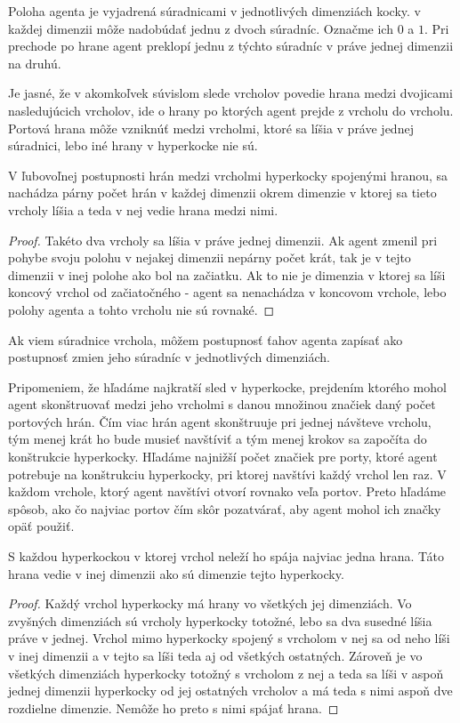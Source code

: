 \begin{ozn}
Poloha agenta je vyjadrená súradnicami v jednotlivých dimenziách kocky. v
každej dimenzii môže nadobúdať jednu z dvoch súradníc. Označme ich $0$ a $1$.
Pri prechode po hrane agent preklopí jednu z týchto súradníc v práve jednej
dimenzii na druhú.
\end{ozn}
Je jasné, že v akomkoľvek súvislom slede vrcholov povedie hrana
medzi dvojicami nasledujúcich vrcholov, ide o hrany po ktorých agent prejde
z vrcholu do vrcholu.
Portová hrana môže vzniknúť medzi vrcholmi, ktoré sa líšia v práve jednej
súradnici, lebo iné hrany v hyperkocke nie sú. 
\begin{lem}
V ľubovoľnej postupnosti hrán medzi vrcholmi hyperkocky spojenými hranou, sa
nachádza párny počet hrán v každej dimenzii okrem dimenzie v ktorej sa tieto
vrcholy líšia a teda v nej vedie hrana medzi nimi.
\end{lem}
\begin{proof}
Takéto dva vrcholy sa líšia v práve jednej dimenzii. Ak agent zmenil pri 
pohybe svoju polohu v nejakej dimenzii nepárny počet 
krát, tak je v tejto dimenzii v inej polohe ako bol na začiatku. Ak to nie je 
dimenzia v ktorej sa líši koncový vrchol od začiatočného - agent sa
nenachádza v koncovom vrchole, lebo polohy agenta a tohto vrcholu nie sú
rovnaké.
\end{proof}

\begin{ozn}
Ak viem súradnice vrchola, môžem postupnosť ťahov agenta zapísať ako postupnosť 
zmien jeho súradníc v jednotlivých dimenziách. 
\end{ozn}


Pripomeniem, že hľadáme najkratší sled v hyperkocke, prejdením ktorého
mohol agent skonštruovať medzi jeho vrcholmi 
s danou množinou značiek daný počet portových hrán. Čím viac hrán agent
skonštruuje pri jednej návšteve vrcholu, tým menej krát ho bude musieť
navštíviť a tým menej krokov sa započíta do konštrukcie hyperkocky.
Hľadáme najnižší počet značiek pre porty, ktoré agent potrebuje na
konštrukciu hyperkocky, pri ktorej navštívi každý vrchol len raz. V každom
vrchole, ktorý agent navštívi otvorí rovnako veľa portov. Preto hľadáme
spôsob, ako čo najviac portov čím skôr pozatvárať, aby agent mohol ich
značky opäť použiť.


\begin{lem}
S každou hyperkockou v ktorej vrchol neleží ho spája najviac jedna hrana.
Táto hrana vedie v inej dimenzii ako sú dimenzie tejto hyperkocky.
\end{lem}
\begin{proof}
Každý vrchol hyperkocky má hrany vo všetkých jej dimenziách. Vo zvyšných
dimenziách sú vrcholy hyperkocky totožné, lebo sa dva susedné líšia práve v
jednej. Vrchol mimo hyperkocky spojený s vrcholom v nej sa od neho líši v
inej dimenzii a v tejto sa líši teda aj od všetkých ostatných. Zároveň je vo
všetkých dimenziách hyperkocky totožný s vrcholom z nej a teda sa líši v
aspoň jednej dimenzii hyperkocky od jej ostatných vrcholov a má teda s nimi
aspoň dve rozdielne dimenzie. Nemôže ho preto s nimi spájať hrana.
\end{proof}

